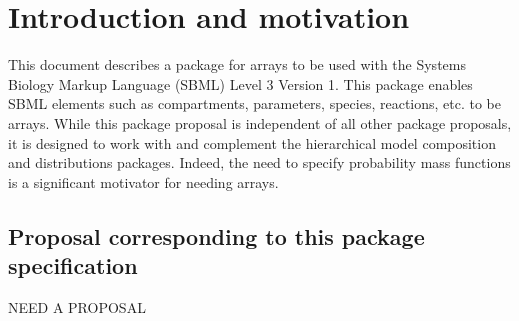 
\section{Introduction and motivation}
\label{intro}

This document describes a package for arrays to be used with the Systems Biology Markup Language (SBML) Level 3 Version 1.  This package enables SBML elements such as compartments, parameters, species, reactions, etc. to be arrays.  While this package proposal is independent of all other package proposals, it is designed to work with and complement the hierarchical model composition and distributions packages.  Indeed, the need to specify probability mass functions is a significant motivator for needing arrays.

\subsection{Proposal corresponding to this package specification}

NEED A PROPOSAL




